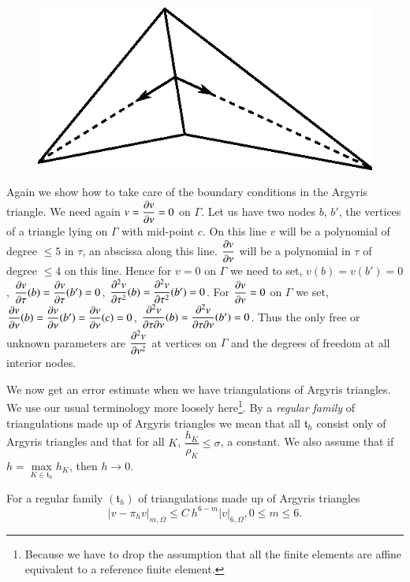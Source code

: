 \begin{figure}[H]
\centering
\includegraphics{figure/fig10.4.eps}
\caption{}\label{chap10-fig10.4}
\end{figure}\pageoriginale

Again we show how to take care of the boundary conditions in the
Argyris triangle. We need again $v=\dfrac{\partial v}{\partial \nu}=0$ on
$\Gamma$. Let us have two nodes $b$, $b'$, the vertices of a triangle
lying on $\Gamma$ with mid-point $c$. On this line $v$ will be a
polynomial of degree $\leq 5$ in $\tau$, an abscissa along this
line. $\dfrac{\partial v}{\partial \nu}$ will be a polynomial in $\tau$ of degree
$\leq 4$ on this line. Hence for $v=0$ on $\Gamma$ we need to set,
$v(b)=v(b')=0$, $\dfrac{\partial v}{\partial \tau}(b)=\dfrac{\partial v}{\partial
  \tau}(b')=0$, $\dfrac{\partial^{2}v}{\partial \tau^{2}}(b)=\dfrac{\partial^{2}v}{\partial
  \tau^{2}}(b')=0$. For $\dfrac{\partial v}{\partial \nu}=0$ on $\Gamma$ we set,
$\dfrac{\partial v}{\partial \nu}(b)=\dfrac{\partial v}{\partial \nu}(b')=\dfrac{\partial v}{\partial
  \nu}(c)=0$, $\dfrac{\partial^{2}v}{\partial \tau\partial \nu}(b)=\dfrac{\partial^{2}v}{\partial
  \tau \partial \nu}(b')=0$. Thus the only free or unknown parameters are
$\dfrac{\partial^{2}v}{\partial \nu^{2}}$ at vertices on $\Gamma$ and the degrees
of freedom at all interior nodes.

We now get an error estimate when we have triangulations of Argyris
triangles. We use our usual terminology more loosely
here\footnote[1]{Because we have to drop the assumption that all the
  finite elements are affine equivalent to a reference finite
  element.}. By a {\em regular family} of triangulations made up of
Argyris triangles we mean that all $\mathfrak{t}_{h}$ consist only of
Argyris triangles and that for all $K$, $\dfrac{h_{K}}{\rho_{K}}\leq
\sigma$, a constant. We also assume that if
$h=\max\limits_{K\in\mathfrak{t}_{h}}h_{K}$, then $h\to 0$.

\begin{theorem}\label{chap10-thm10.1}
For a regular family $(\mathfrak{t}_{h})$ of triangulations made up of
Argyris triangles
\begin{equation*}
|v-\pi_{h}v|_{m,\Omega}\leq C\ h^{6-m}|v|_{6,\Omega},0\leq m\leq 6.\tag{10.11}\label{chap10-eq10.11}
\end{equation*}\pageoriginale
\end{theorem}

